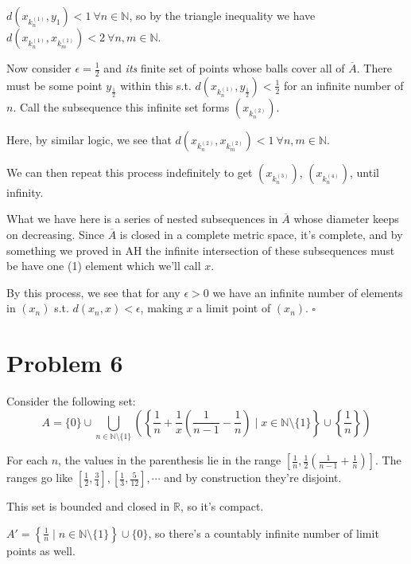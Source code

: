 \documentclass[12pt]{article}
\newcommand{\N}{\mathbb{N}}
\newcommand{\R}{\mathbb{R}}
\begin{document}
$d\left(x_{k^{(1)}_n}, y_1\right) < 1\ \forall n \in \N$, so by the triangle inequality we have
$d\left(x_{k^{(1)}_n}, x_{k^{(1)}_m}\right) < 2\ \forall n, m \in \N$.

Now consider $\epsilon=\frac{1}{2}$ and \textit{its} finite set of points
whose balls cover all of $\overline{A}$.
There must be some point $y_\frac{1}{2}$ within this
s.t. $d\left(x_{k^{(1)}_n}, y_\frac{1}{2}\right) < \frac{1}{2}$ for an infinite number of $n$.
Call the subsequence this infinite set forms $(x_{k^{(2)}_n})$.

Here, by similar logic, we see that
$d\left(x_{k^{(2)}_n}, x_{k^{(2)}_m}\right) < 1\ \forall n, m \in \N$.

We can then repeat this process indefinitely to get $(x_{k^{(3)}_n})$, $(x_{k^{(4)}_n})$, until infinity.

What we have here is a series of nested subsequences in $\overline{A}$
whose diameter keeps on decreasing.
Since $\overline{A}$ is closed in a complete metric space, it's complete,
and by something we proved in AH the infinite intersection of these subsequences
must be have one (1) element which we'll call $x$.

By this process, we see that for any $\epsilon > 0$ we have an
infinite number of elements in $(x_n)$ s.t. $d(x_n, x) < \epsilon$,
making $x$ a limit point of $(x_n)$. $\square$

\pagebreak

\section{Problem 6}

Consider the following set:
\[A=\{0\} \cup
  \bigcup_{n \in \N \setminus \{1\}}
  \left(\left\{\frac{1}{n} + \frac{1}{x}\left(\frac{1}{n-1}-\frac{1}{n}\right)
  \mid x \in \N \setminus \{1\}\right\}
  \cup \left\{\frac{1}{n}\right\}\right)\]

For each $n$, the values in the parenthesis lie in the range $\left[\frac{1}{n}, \frac{1}{2}\left(\frac{1}{n-1}+\frac{1}{n}\right)\right]$.
The ranges go like $\left[\frac{1}{2}, \frac{3}{4}\right], \left[\frac{1}{3}, \frac{5}{12}\right], \cdots$
and by construction they're disjoint.

This set is bounded and closed in $\R$, so it's compact.

$A'=\left\{\frac{1}{n} \mid n \in \N \setminus \{1\}\right\} \cup \{0\}$,
so there's a countably infinite number of limit points as well.
\end{document}
